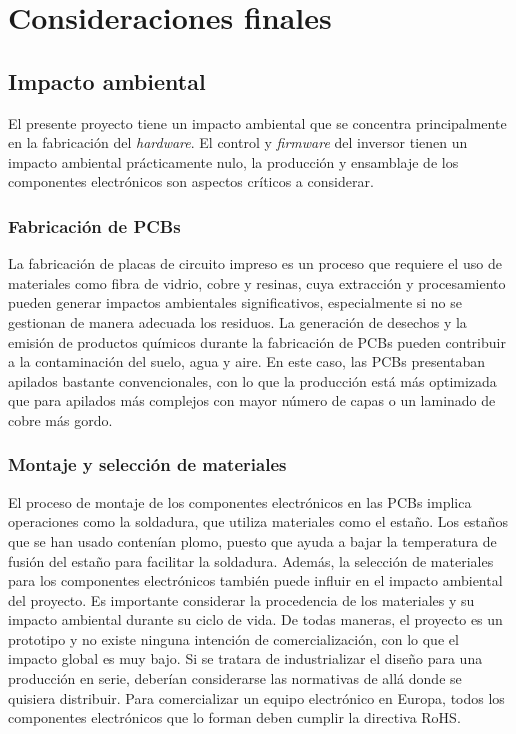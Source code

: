 \chapter{Consideraciones finales}

\section{Impacto ambiental}

El presente proyecto tiene un impacto ambiental que se concentra principalmente en la fabricación del \textit{hardware}. El control y \textit{firmware} del inversor tienen un impacto ambiental prácticamente nulo, la producción y ensamblaje de los componentes electrónicos son aspectos críticos a considerar.

\subsection{Fabricación de PCBs}

La fabricación de placas de circuito impreso es un proceso que requiere el uso de materiales como fibra de vidrio, cobre y resinas, cuya extracción y procesamiento pueden generar impactos ambientales significativos, especialmente si no se gestionan de manera adecuada los residuos. La generación de desechos y la emisión de productos químicos durante la fabricación de PCBs pueden contribuir a la contaminación del suelo, agua y aire. En este caso, las PCBs presentaban apilados bastante convencionales, con lo que la producción está más optimizada que para apilados más complejos con mayor número de capas o un laminado de cobre más gordo.

\subsection{Montaje y selección de materiales}

El proceso de montaje de los componentes electrónicos en las PCBs implica operaciones como la soldadura, que utiliza materiales como el estaño. Los estaños que se han usado contenían plomo, puesto que ayuda a bajar la temperatura de fusión del estaño para facilitar la soldadura. Además, la selección de materiales para los componentes electrónicos también puede influir en el impacto ambiental del proyecto. Es importante considerar la procedencia de los materiales y su impacto ambiental durante su ciclo de vida. De todas maneras, el proyecto es un prototipo y no existe ninguna intención de comercialización, con lo que el impacto global es muy bajo. Si se tratara de industrializar el diseño para una producción en serie, deberían considerarse las normativas de allá donde se quisiera distribuir. Para comercializar un equipo electrónico en Europa, todos los componentes electrónicos que lo forman deben cumplir la directiva RoHS.

